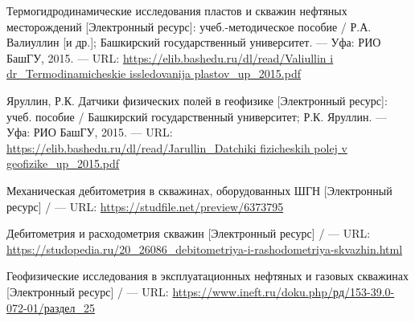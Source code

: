 \begingroup 
\renewcommand{\section}[2]{\anonsection{Библиографический список}}
\begin{thebibliography}{00}

    Термогидродинамические исследования пластов и скважин нефтяных месторождений
    [Электронный ресурс]: учеб.-методическое пособие /
    Р.А. Валиуллин [и др.];
    Башкирский государственный университет.
    --- Уфа: РИО БашГУ, 2015.
    --- URL: \url{https://elib.bashedu.ru/dl/read/Valiullin i dr_Termodinamicheskie issledovanija plastov_up_2015.pdf}

    Яруллин, Р.К. Датчики физических полей в геофизике
    [Электронный ресурс]: учеб. пособие /
    Башкирский государственный университет; Р.К. Яруллин.
    --- Уфа: РИО БашГУ, 2015.
    --- URL: \url{https://elib.bashedu.ru/dl/read/Jarullin_Datchiki fizicheskih polej v geofizike_up_2015.pdf}

    Механическая дебитометрия в скважинах, оборудованных ШГН
    [Электронный ресурс] /
    --- URL: \url{https://studfile.net/preview/6373795}

    Дебитометрия и расходометрия скважин
    [Электронный ресурс] /
    --- URL: \url{https://studopedia.ru/20\_26086\_debitometriya-i-rashodometriya-skvazhin.html}

    Геофизические исследования в эксплуатационных нефтяных и газовых скважинах
    [Электронный ресурс] /
    --- URL: \url{https://www.ineft.ru/doku.php/рд/153-39.0-072-01/раздел_25}

\end{thebibliography}
\endgroup

\clearpage
